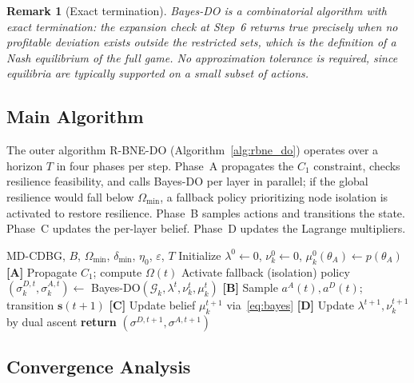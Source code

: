 \documentclass[conference]{IEEEtran}
\newtheorem{remark}{Remark}
\begin{document}
\begin{remark}[Exact termination]
Bayes-DO is a combinatorial algorithm with exact termination: the expansion
check at Step~6 returns true precisely when no profitable deviation exists
outside the restricted sets, which is the definition of a Nash equilibrium of
the full game. No approximation tolerance is required, since equilibria are
typically supported on a small subset of actions.
\end{remark}

\subsection{Main Algorithm}

The outer algorithm R-BNE-DO (Algorithm~\ref{alg:rbne_do}) operates over a
horizon $T$ in four phases per step. Phase~A propagates the $C_1$ constraint,
checks resilience feasibility, and calls Bayes-DO per layer in parallel; if the
global resilience would fall below $\Omega_{\min}$, a fallback policy
prioritizing node isolation is activated to restore resilience. Phase~B samples
actions and transitions the state. Phase~C updates the per-layer belief.
Phase~D updates the Lagrange multipliers.

\begin{algorithm}[t]
\caption{R-BNE-DO: R-BNE via Bayesian Double Oracle}
\label{alg:rbne_do}
\begin{algorithmic}[1]
\REQUIRE MD-CDBG, $B$, $\Omega_{\min}$, $\delta_{\min}$, $\eta_0$,
$\varepsilon$, $T$
\STATE Initialize $\lambda^0\gets0$, $\nu_k^0\gets0$,
$\mu_k^0(\theta_A)\gets p(\theta_A)$
\STATE \textbf{[A]} Propagate $C_1$; compute $\Omega(t)$
\STATE Activate fallback (isolation) policy
\ELSE
\STATE $(\sigma_k^{D,t},\sigma_k^{A,t})\gets$
Bayes-DO$(\mathcal{G}_k,\lambda^t,\nu_k^t,\mu_k^t)$
\ENDIF
\ENDFOR
\STATE \textbf{[B]} Sample $a^A(t),a^D(t)$; transition $\mathbf{s}(t{+}1)$
\STATE \textbf{[C]} Update belief $\mu_k^{t+1}$ via~\eqref{eq:bayes}
\STATE \textbf{[D]} Update $\lambda^{t+1},\nu_k^{t+1}$ by dual ascent
\STATE \textbf{return} $(\sigma^{D,t+1},\sigma^{A,t+1})$
\ENDIF
\ENDFOR
\end{algorithmic}
\end{algorithm}

\subsection{Convergence Analysis}
\end{document}
